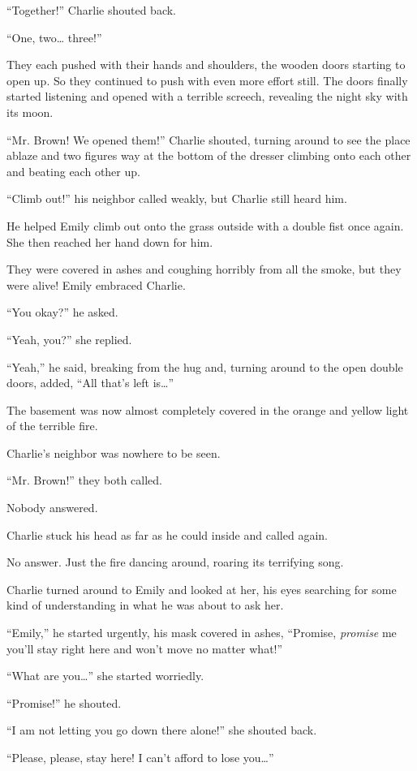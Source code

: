 “Together!” Charlie shouted back.

“One, two… three!”

They each pushed with their hands and shoulders, the wooden doors starting to open up. So they continued to push with even more effort still. The doors finally started listening and opened with a terrible screech, revealing the night sky with its moon.

“Mr. Brown! We opened them!” Charlie shouted, turning around to see the place ablaze and two figures way at the bottom of the dresser climbing onto each other and beating each other up.

“Climb out!” his neighbor called weakly, but Charlie still heard him.

He helped Emily climb out onto the grass outside with a double fist once again. She then reached her hand down for him.

They were covered in ashes and coughing horribly from all the smoke, but they were alive! Emily embraced Charlie.

“You okay?” he asked.

“Yeah, you?” she replied.

“Yeah,” he said, breaking from the hug and, turning around to the open double doors, added, “All that's left is…”

The basement was now almost completely covered in the orange and yellow light of the terrible fire.

Charlie's neighbor was nowhere to be seen.

“Mr. Brown!” they both called.

Nobody answered.

Charlie stuck his head as far as he could inside and called again.

No answer. Just the fire dancing around, roaring its terrifying song.

Charlie turned around to Emily and looked at her, his eyes searching for some kind of understanding in what he was about to ask her.

“Emily,” he started urgently, his mask covered in ashes, “Promise, \textit{promise} me you'll stay right here and won't move no matter what!”

“What are you…” she started worriedly.

“Promise!” he shouted.

“I am not letting you go down there alone!” she shouted back.

“Please, please, stay here! I can't afford to lose you…”

